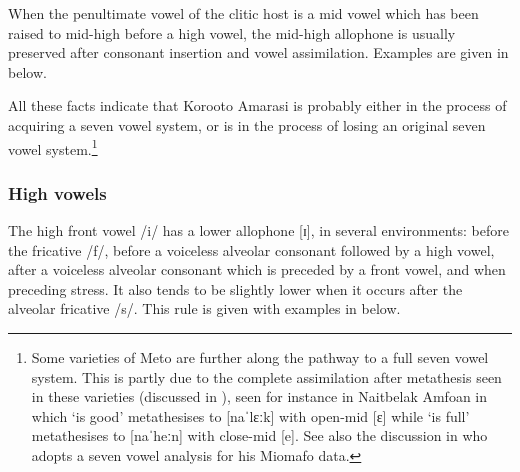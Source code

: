 When the penultimate vowel of the clitic host
is a mid vowel which has been raised to mid-high before a high vowel,
the mid-high allophone is usually preserved after consonant insertion and vowel assimilation.
Examples are given in  below.

\begin{exe}
\end{exe}

All these facts indicate that Koro{\Q}oto Amarasi is probably either in the process of acquiring
a seven vowel system, or is in the process of losing an original seven vowel system.\footnote{
		Some varieties of Meto are further along the pathway to a full seven vowel system.
		This is partly due to the complete assimilation after
		metathesis seen in these varieties (discussed in ),
		seen for instance in Naitbelak Amfo{\Q}an in which  `is good'
		metathesises to [naˈlɛːk] with open-mid [ɛ]
		while  `is full' metathesises to [naˈheːn] with close-mid [e].
		See also the discussion in \citet{st93,st96,st96b,st08}
		who adopts a seven vowel analysis for his Miomafo data.}

\subsubsection{High vowels}
The high front vowel /i/ has a lower allophone [ɪ], in several environments:
before the fricative /f/, before a voiceless alveolar consonant followed by a high vowel,
after a voiceless alveolar consonant which is preceded by a front vowel, and when preceding stress.
It also tends to be slightly lower when it occurs after the alveolar fricative /s/.
This rule is given with examples in  below.

